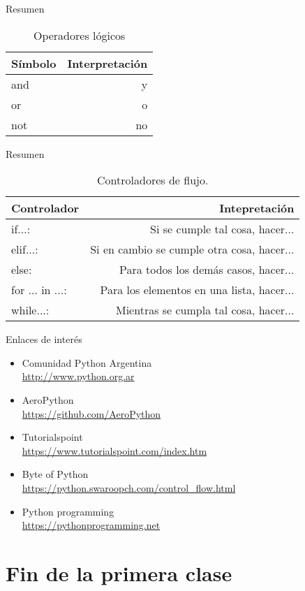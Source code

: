 \documentclass[10pt]{beamer}
\begin{document}
\begin{frame}{Resumen}
	\begin{table}
		\caption{Operadores lógicos}
		\begin{tabular}{lr}
			\toprule
			Símbolo&Interpretación\\
			\midrule
			and & y\\
			or  & o\\
			not & no\\
			\bottomrule
		\end{tabular}
	\end{table}
\end{frame}

\begin{frame}{Resumen}
	\begin{table}
		\caption{Controladores de flujo.}
		\begin{tabular}{lr}
			\toprule
			Controlador&Intepretación\\
			\midrule
			if...:&Si se cumple tal cosa, hacer...\\
			elif...:&Si en cambio se cumple otra cosa, hacer...\\ 
			else:&Para todos los demás casos, hacer...\\
			for ... in ...:&Para los elementos en una lista, hacer...\\
			while...:&Mientras se cumpla tal cosa, hacer...\\ 
			\bottomrule
		\end{tabular}
	\end{table}
\end{frame}
\appendix

\begin{frame}{Enlaces de interés}
	\begin{itemize}
		\item \alert{Comunidad Python Argentina}\\ \url{http://www.python.org.ar}
		\item \alert{AeroPython}\\ \url{https://github.com/AeroPython}
		\item \alert{Tutorialspoint}\\ \url{https://www.tutorialspoint.com/index.htm}
		\item \alert{Byte of Python}\\ \url{https://python.swaroopch.com/control_flow.html}
		\item \alert{Python programming}\\ \url{https://pythonprogramming.net}
	\end{itemize}
\end{frame}
\section{Fin de la primera clase}
\end{document}
